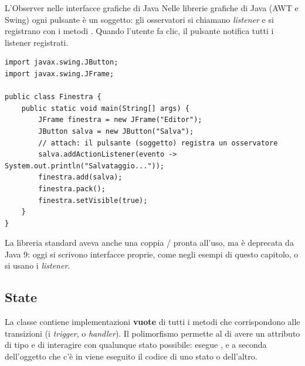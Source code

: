 \begin{esempio}{L'Observer nelle interfacce grafiche di Java}
Nelle librerie grafiche di Java (AWT e Swing) ogni pulsante è un soggetto: gli osservatori si chiamano \textit{listener} e
si registrano con i metodi . Quando l'utente fa clic, il pulsante notifica tutti i listener
registrati.
\begin{lstlisting}[style=java, name=Finestra.java]
import javax.swing.JButton;
import javax.swing.JFrame;

public class Finestra {
    public static void main(String[] args) {
        JFrame finestra = new JFrame("Editor");
        JButton salva = new JButton("Salva");
        // attach: il pulsante (soggetto) registra un osservatore
        salva.addActionListener(evento -> System.out.println("Salvataggio..."));
        finestra.add(salva);
        finestra.pack();
        finestra.setVisible(true);
    }
}
\end{lstlisting}
La libreria standard aveva anche una coppia  /  pronta all'uso, ma è
deprecata da Java 9: oggi si scrivono interfacce proprie, come negli esempi di questo capitolo, o si usano i
\textit{listener}.
\end{esempio}

\subsection{State}


\noindent\begin{minipage}[c]{0.55\textwidth}
La classe  contiene implementazioni \textbf{vuote} di tutti i metodi che corrispondono alle transizioni (i
\textit{trigger}, o \textit{handler}). Il polimorfismo permette al  di avere un attributo di tipo
 e di interagire con qualunque stato possibile:  esegue , e a seconda
dell'oggetto che c'è in  viene eseguito il codice di uno stato o dell'altro.
\end{minipage}\hfill
\begin{minipage}[c]{0.42\textwidth}
\centering
{}
\end{minipage}


